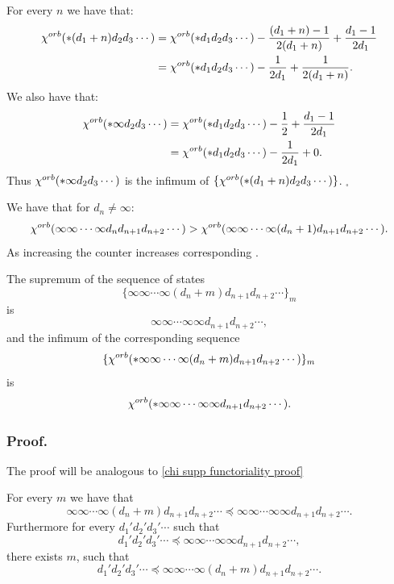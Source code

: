 For every $n$ we have that: 
\begin{align}
{\chi^{orb}(*(d_1+n)d_2d_3\cdots)} &= {\chi^{orb}(*d_1d_2d_3\cdots)} 
- \frac{(d_1+n)-1}{2(d_1+n)} + \frac{d_1-1}{2d_1} \notag\\ 
&= {\chi^{orb}(*d_1d_2d_3\cdots)} - \frac{1}{2d_1} + \frac{1}{2(d_1+n)}.
\end{align}
We also have that:
\begin{align}
{\chi^{orb}(*\infty d_2d_3\cdots)} &= {\chi^{orb}(*d_1d_2d_3\cdots)} 
- \frac{1}{2} + \frac{d_1-1}{2d_1} \notag\\ 
&= {\chi^{orb}(*d_1d_2d_3\cdots)} - \frac{1}{2d_1} + 0.
\end{align}
Thus ${\chi^{orb}(*\infty d_2d_3\cdots)}$ is the infimum of $\{{\chi^{orb}(*(d_1+n)d_2d_3\cdots)}\}$.
$_\square$
\begin{observation}
We have that for $d_n \neq \infty$:
\begin{equation}
{\chi^{orb}(\infty\infty\cdots\infty d_n d_{n+1} d_{n+2}\cdots)} > 
{\chi^{orb}(\infty\infty\cdots\infty (d_n+1) d_{n+1} d_{n+2}\cdots)}. 
\end{equation}
As increasing the counter increases corresponding \Eoc.
\end{observation}

\begin{lemma}\label{chi supp functoriality non finite}
The supremum of the sequence 
of states 
\begin{equation}
\{\infty\infty\cdots\infty (d_n+m) d_{n+1} d_{n+2}\cdots\}_m
\end{equation} 
is 
\begin{equation}
\infty\infty\cdots\infty \infty d_{n+1} d_{n+2}\cdots,
\end{equation} and 
the infimum of the corresponding sequence 
\begin{equation}
\{{\chi^{orb}(*\infty\infty\cdots\infty (d_n+m) d_{n+1} d_{n+2}\cdots)}\}_m
\end{equation} is  
\begin{equation}
{\chi^{orb}(*\infty\infty\cdots\infty \infty d_{n+1} d_{n+2}\cdots)}.
\end{equation}
\end{lemma}
\subsubsection{Proof.}
The proof will be analogous to \ref{chi supp functoriality proof}

For every $m$ we have that 
\begin{equation}
\infty\infty\cdots\infty(d_n+m)d_{n+1}d_{n+2}\cdots\preceq
\infty\infty\cdots\infty \infty d_{n+1} d_{n+2}\cdots.
\end{equation} 
Furthermore for 
every $d_1'd_2'd_3'\cdots$ such that 
\begin{equation}
d_1'd_2'd_3'\cdots\preceq \infty\infty\cdots\infty \infty d_{n+1} d_{n+2}\cdots,
\end{equation} there 
exists $m$, such that 
\begin{equation}
d_1'd_2'd_3' \cdots\preceq\infty\infty\cdots\infty(d_n+m)d_{n+1}d_{n+2}\cdots.
\end{equation} 

